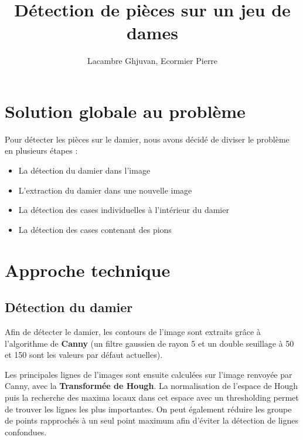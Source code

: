 \documentclass[a4paper, 12pt]{report}
\begin{document}

\title{Détection de pièces sur un jeu de dames}
\author{Lacambre Ghjuvan, Ecormier Pierre}

\maketitle

\section{Solution globale au problème}

Pour détecter les pièces sur le damier, nous avons décidé de diviser le problème en plusieurs étapes :
\begin{itemize}
\item La détection du damier dans l'image
\item L'extraction du damier dans une nouvelle image
\item La détection des cases individuelles à l'intérieur du damier
\item La détection des cases contenant des pions
\end{itemize}

\section{Approche technique}

\subsection*{Détection du damier}

Afin de détecter le damier, les contours de l'image sont extraits grâce à l'algorithme de \textbf{Canny} (un filtre gaussien de rayon 5 et un double seuillage à 50 et 150 sont les valeurs par défaut actuelles).

Les principales lignes de l'images sont ensuite calculées sur l'image renvoyée par Canny, avec la \textbf{Transformée de Hough}. La normalisation de l'espace de Hough puis la recherche des maxima locaux dans cet espace avec un thresholding permet de trouver les lignes les plus importantes. On peut également réduire les groupe de points rapprochés à un seul point maximum afin d'éviter la détection de lignes confondues.
\end{document}
